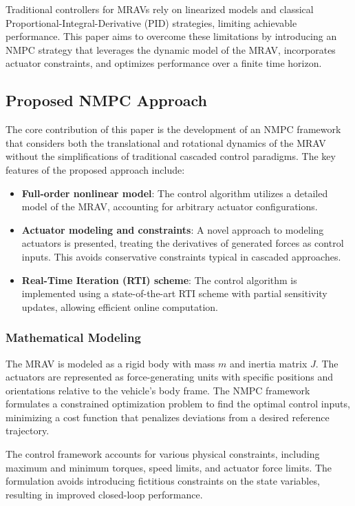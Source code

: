 \documentclass[a4paper,12pt]{article}
\begin{document}
    Traditional controllers for MRAVs rely on linearized models and classical Proportional-Integral-Derivative (PID) strategies, limiting achievable performance. This paper aims to overcome these limitations by introducing an NMPC strategy that leverages the dynamic model of the MRAV, incorporates actuator constraints, and optimizes performance over a finite time horizon.

    \subsection{Proposed NMPC Approach}
    The core contribution of this paper is the development of an NMPC framework that considers both the translational and rotational dynamics of the MRAV without the simplifications of traditional cascaded control paradigms. The key features of the proposed approach include:

    \begin{itemize}
        \item \textbf{Full-order nonlinear model}: The control algorithm utilizes a detailed model of the MRAV, accounting for arbitrary actuator configurations.
        \item \textbf{Actuator modeling and constraints}: A novel approach to modeling actuators is presented, treating the derivatives of generated forces as control inputs. This avoids conservative constraints typical in cascaded approaches.
        \item \textbf{Real-Time Iteration (RTI) scheme}: The control algorithm is implemented using a state-of-the-art RTI scheme with partial sensitivity updates, allowing efficient online computation.
    \end{itemize}

    \subsubsection{Mathematical Modeling}
    The MRAV is modeled as a rigid body with mass \( m \) and inertia matrix \( J \). The actuators are represented as force-generating units with specific positions and orientations relative to the vehicle's body frame. The NMPC framework formulates a constrained optimization problem to find the optimal control inputs, minimizing a cost function that penalizes deviations from a desired reference trajectory.

    The control framework accounts for various physical constraints, including maximum and minimum torques, speed limits, and actuator force limits. The formulation avoids introducing fictitious constraints on the state variables, resulting in improved closed-loop performance.
\end{document}
